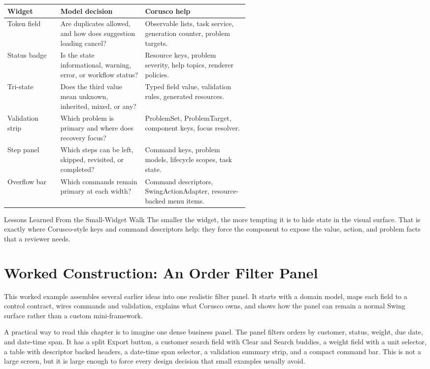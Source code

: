 \begin{tabularx}{0.96\linewidth}{@{}p{0.22\linewidth}p{0.35\linewidth}X@{}}
\toprule
Widget & Model decision & Corusco help\\
\midrule
Token field & Are duplicates allowed, and how does suggestion loading cancel? & Observable lists, task service, generation counter, problem targets.\\
Status badge & Is the state informational, warning, error, or workflow status? & Resource keys, problem severity, help topics, renderer policies.\\
Tri-state & Does the third value mean unknown, inherited, mixed, or any? & Typed field value, validation rules, generated resources.\\
Validation strip & Which problem is primary and where does recovery focus? & ProblemSet, ProblemTarget, component keys, focus resolver.\\
Step panel & Which steps can be left, skipped, revisited, or completed? & Command keys, problem models, lifecycle scopes, task state.\\
Overflow bar & Which commands remain primary at each width? & Command descriptors, SwingActionAdapter, resource-backed menu items.\\
\bottomrule
\end{tabularx}

\begin{principlebox}{Lessons Learned From the Small-Widget Walk}
The smaller the widget, the more tempting it is to hide state in the visual
surface. That is exactly where Corusco-style keys and command descriptors help:
they force the component to expose the value, action, and problem facts that a
reviewer needs.
\end{principlebox}

\section{Worked Construction: An Order Filter Panel}

\begin{roadmapbox}
This worked example assembles several earlier ideas into one realistic filter
panel. It starts with a domain model, maps each field to a control contract,
wires commands and validation, explains what Corusco owns, and shows how the
panel can remain a normal Swing surface rather than a custom mini-framework.
\end{roadmapbox}

A practical way to read this chapter is to imagine one dense business panel.
The panel filters orders by customer, status, weight, due date, and date-time
span. It has a split Export button, a customer search field with Clear and
Search buddies, a weight field with a unit selector, a table with descriptor
backed headers, a date-time span selector, a validation summary strip, and a
compact command bar. This is not a large screen, but it is large enough to
force every design decision that small examples usually avoid.

